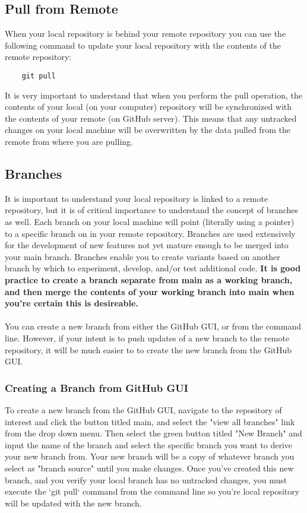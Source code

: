 \documentclass{article}
\begin{document}
\subsection*{Pull from Remote}
When your local repository is behind your remote repository you can use the following command to update your local repository with the contents of the remote repository:
\begin{verbatim}
    git pull
\end{verbatim}
It is very important to understand that when you perform the pull operation, the contents of your local (on your computer) repository will be synchronized with the contents of your remote (on GitHub server). This means that any untracked changes on your local machine will be overwritten by the data pulled from the remote from where you are pulling.

\subsection*{Branches}
It is important to understand your local repository is linked to a remote repository, but it is of critical importance to understand the concept of branches as well. Each branch on your local machine will point (literally using a pointer) to a specific branch on in your remote repository. Branches are used extensively for the development of new features not yet mature enough to be merged into your main branch. Branches enable you to create variants based on another branch by which to experiment, develop, and/or test additional code. \textbf{It is good practice to create a branch separate from main as a working branch, and then merge the contents of your working branch into main when you're certain this is desireable.}\\\\
You can create a new branch from either the GitHub GUI, or from the command line. However, if your intent is to push updates of a new branch to the remote repository, it will be much easier to to create the new branch from the GitHub GUI. 

\subsubsection*{Creating a Branch from GitHub GUI}
To create a new branch from the GitHub GUI, navigate to the repository of interest and click the button titled main, and select the "view all branches" link from the drop down menu. Then select the green button titled "New Branch" and input the name of the branch and select the specific branch you want to derive your new branch from. Your new branch will be a copy of whatever branch you select as "branch source" until you make changes. Once you've created this new branch, and you verify your local branch has no untracked changes, you must execute the `git pull` command from the command line so you're local repository will be updated with the new branch.
\end{document}
